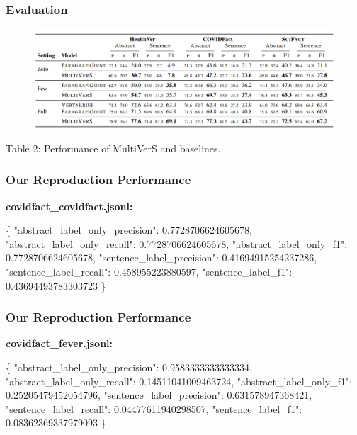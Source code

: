 \documentclass[13.5pt,aspecratio=169, xcolor=dvipsnames]{beamer}
\begin{document}
\begin{frame}
    \onehalfspacing
        \frametitle{Evaluation}
        \begin{figure}[h]
            \centering
            \includegraphics[width=\textwidth]{Results.png}
        \end{figure}
        \begin{center}
            Table 2: Performance of MultiVerS and baselines.
        \end{center}
    
\end{frame}
\begin{frame}[fragile]
    \onehalfspacing
        \frametitle{Our Reproduction Performance}
        \textbf{covidfact\_covidfact.jsonl:}
        \vspace*{-1em} 
        \begin{mybox}
        \begin{semiverbatim}
\{
    "abstract_label_only_precision": 0.7728706624605678,
    "abstract_label_only_recall": 0.7728706624605678,
    "abstract_label_only_f1": 0.7728706624605678,
    "sentence_label_precision": 0.41694915254237286,
    "sentence_label_recall": 0.458955223880597,
    "sentence_label_f1": 0.43694493783303723
\}\end{semiverbatim}
    \end{mybox}
\end{frame}



\begin{frame}[fragile]
    \onehalfspacing
        \frametitle{Our Reproduction Performance}
        \textbf{covidfact\_fever.jsonl:}
\vspace*{-1em} 
\begin{mybox}
\begin{semiverbatim}
\{
    "abstract_label_only_precision": 0.9583333333333334,
    "abstract_label_only_recall": 0.14511041009463724,
    "abstract_label_only_f1": 0.25205479452054796,
    "sentence_label_precision": 0.631578947368421,
    "sentence_label_recall": 0.04477611940298507,
    "sentence_label_f1": 0.08362369337979093
\}\end{semiverbatim}
\end{mybox}
\end{frame}
\end{document}
